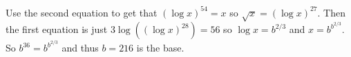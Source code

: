 Use the second equation to get that $\left(\log x\right)^{54}=x$ so $\sqrt{x}=\left(\log x\right)^{27}$. Then the first equation is just $3\log\left(\left(\log x\right)^{28}\right)=56$ so $\log x=b^{2/3}$ and $x=b^{b^{2/3}}$. So $b^{36}=b^{b^{2/3}}$ and thus $b=\boxed{216}$ is the base.